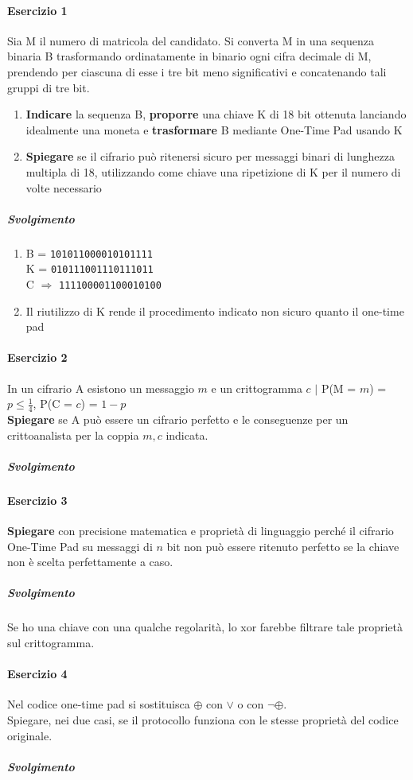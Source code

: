 \documentclass[10pt]{book}
\begin{document}
\paragraph{Esercizio 1} Sia M il numero di matricola del candidato. Si converta M in una sequenza binaria B trasformando
ordinatamente in binario ogni cifra decimale di M, prendendo per ciascuna di esse i tre bit meno significativi e concatenando tali gruppi di tre bit.
\begin{enumerate}
	\item \textbf{Indicare} la sequenza B, \textbf{proporre} una chiave K di 18 bit ottenuta lanciando idealmente una moneta e \textbf{trasformare} B mediante One-Time Pad usando K
	\item \textbf{Spiegare} se il cifrario può ritenersi sicuro per messaggi binari di lunghezza multipla di 18, utilizzando come chiave una ripetizione di K per il numero di volte necessario
\end{enumerate}
\subparagraph{Svolgimento}
\begin{enumerate}
	\item B = \texttt{101011000010101111}\\
	K = \texttt{010111001110111011}\\
	C $\Rightarrow$ \texttt{111100001100010100}
	\item Il riutilizzo di K rende il procedimento indicato non sicuro quanto il one-time pad
\end{enumerate}
\paragraph{Esercizio 2} In un cifrario A esistono un messaggio $m$ e un crittogramma $c$ $|$ P(M = $m$) = $p \leq \frac{1}{4}$, P(C = $c$) = $1 - p$\\
\textbf{Spiegare} se A può essere un cifrario perfetto e le conseguenze per un crittoanalista per la coppia $m,c$ indicata.
\subparagraph{Svolgimento}
\paragraph{Esercizio 3} \textbf{Spiegare} con precisione matematica e proprietà di linguaggio perché il cifrario One-Time Pad su messaggi di $n$ bit non può essere ritenuto perfetto se la chiave non è scelta perfettamente a caso.
\subparagraph{Svolgimento} Se ho una chiave con una qualche regolarità, lo xor farebbe filtrare tale proprietà sul crittogramma.
\paragraph{Esercizio 4} Nel codice one-time pad si sostituisca $\oplus$ con $\vee$ o con $\neg\oplus$.\\
Spiegare, nei due casi, se il protocollo funziona con le stesse proprietà del codice originale.
\subparagraph{Svolgimento} 
\end{document}
